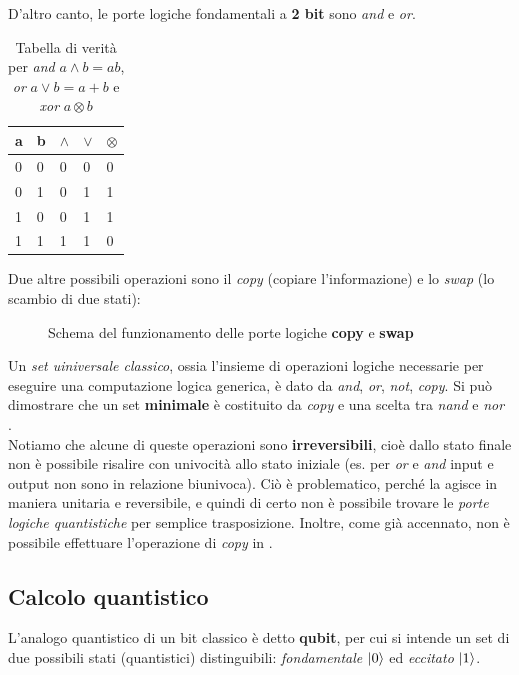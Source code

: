\documentclass[../../InformazioneQuantistica.tex]{subfiles}
\begin{document}
D'altro canto, le porte logiche fondamentali a \textbf{2 bit} sono \textit{and} e \textit{or}.
\begin{table}[H]
\centering
\begin{tabular}{@{}ll|lll@{}}
\toprule
\multicolumn{1}{c}{a} & \multicolumn{1}{c}{b} & \multicolumn{1}{c}{$\land$} & \multicolumn{1}{c}{$\lor$} & \multicolumn{1}{c}{$\otimes$} \\ \midrule
0 & 0 & 0 & 0 & 0 \\
0 & 1 & 0 & 1 & 1 \\
1 & 0 & 0 & 1 & 1 \\
1 & 1 & 1 & 1 & 0 \\ \bottomrule
\end{tabular}
\caption{Tabella di verità per \textit{and} $a \land b = ab$, \textit{or} $a\lor b =a+b$ e \textit{xor} $a\otimes b$}
\label{tab:orandxor}
\end{table}

Due altre possibili operazioni sono il \emph{copy} (copiare l'informazione) e lo \emph{swap} (lo scambio di due stati):

\begin{figure}[H]
\centering

\caption{Schema del funzionamento delle porte logiche \textbf{copy} e \textbf{swap}\label{fig:copy-swap}}
\end{figure}

Un \textit{set uiniversale classico}, ossia l'insieme di operazioni logiche necessarie per eseguire una computazione logica generica, è dato da \textit{and}, \textit{or}, \textit{not}, \textit{copy}. Si può dimostrare che un set \textbf{minimale} è costituito da \textit{copy} e una scelta tra \textit{nand} e \textit{nor} \cite{nand2tetris}.\\

Notiamo che alcune di queste operazioni sono \textbf{irreversibili}, cioè dallo stato finale non è possibile risalire con univocità allo stato iniziale (es. per \textit{or} e \textit{and} input e output non sono in relazione biunivoca). Ciò è problematico, perché la \MQ agisce in maniera unitaria e reversibile, e quindi di certo non è possibile trovare le \textit{porte logiche quantistiche} per semplice trasposizione. Inoltre, come già accennato, non è possibile effettuare l'operazione di \textit{copy} in \MQ.

\subsection{Calcolo quantistico}
L'analogo quantistico di un bit classico è detto \textbf{qubit}, per cui si intende un set di due possibili stati (quantistici) distinguibili: \textit{fondamentale} $\Ket{0}$ ed \textit{eccitato} $\Ket{1}$.
\end{document}
